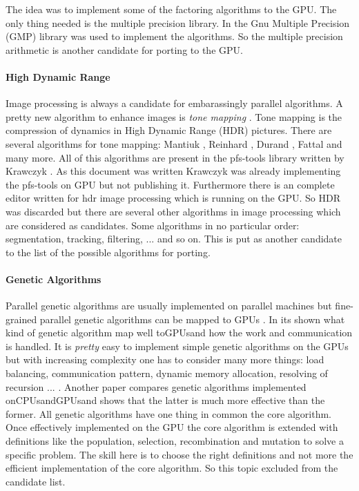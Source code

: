 The idea was to implement some of the factoring algorithms to the GPU. The only
thing needed is the multiple precision library. In \citep{citeulike:3783254} the
Gnu Multiple Precision (GMP) library was used to implement the algorithms. So
the multiple precision arithmetic is another candidate for porting to the GPU.

\paragraph{High Dynamic Range} %
\label{par:high_dynamic_range}
Image processing is always a candidate for embarassingly parallel algorithms. A
pretty new algorithm to enhance images is \emph{tone mapping}
\citep{citeulike:3783303}. Tone mapping is the compression of dynamics in High
Dynamic Range (HDR) pictures. There are several algorithms for tone mapping:
Mantiuk \citep{citeulike:3783315}, Reinhard \citep{citeulike:3783311}, Durand
\citep{citeulike:789299}, Fattal \citep{citeulike:3783313} and many more. All of
this algorithms are present in the pfs-tools library written by Krawczyk
\citep{citeulike:3783303}. As this document was written Krawczyk was already
implementing the pfs-tools on \gls{GPU} but not publishing it. Furthermore there is an
complete editor written for hdr image processing which is running on the GPU. So
HDR was discarded but there are several other algorithms in image processing
which are considered as candidates. Some algorithms in no particular order:
segmentation, tracking, filtering, ... and so on. This is put as another
candidate to the list of the possible algorithms for porting. 

\paragraph{Genetic Algorithms} %
\label{par:genetic_algorithms}
Parallel genetic algorithms are usually implemented on parallel machines but
fine-grained parallel genetic algorithms can be mapped to GPUs
\citep{citeulike:3801879}. In \citep{citeulike:3801866} its shown what kind of
genetic algorithm map well to\glspl{GPU}and how the work and communication is
handled. It is \emph{pretty} easy to implement simple genetic algorithms on the
GPUs but with increasing complexity one has to consider many more things: load
balancing, communication pattern, dynamic memory allocation, resolving of
recursion ... . Another paper \citep{citeulike:3801883} compares genetic
algorithms implemented on\glspl{CPU}and\glspl{GPU}and shows that the latter is much more
effective than the former. All genetic algorithms have one thing in common the
core algorithm. Once effectively implemented on the \gls{GPU} the core algorithm is
extended with definitions like the population, selection, recombination and
mutation to solve a specific problem. The skill here is to choose the right
definitions and not more the efficient implementation of the core algorithm. So
this topic excluded from the candidate list.

